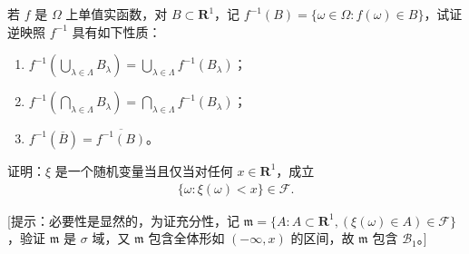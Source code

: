 \documentclass[../../main.tex]{subfiles}
\begin{document}
\begin{exercise}\label{exercise:ch03-49}
若 $f$ 是 $\varOmega$ 上单值实函数，对 $B\subset\mathbf{R}^{1}$，记 $f^{-1}(B)=\{\omega\in\varOmega:f(\omega)\in B\}$，试证逆映照 $f^{-1}$ 具有如下性质：
\begin{enumerate}
\item $f^{-1}\!\left(\bigcup_{\lambda\in\varLambda}B_\lambda\right)=\bigcup_{\lambda\in\varLambda}f^{-1}(B_\lambda)$；
\item $f^{-1}\!\left(\bigcap_{\lambda\in\varLambda}B_\lambda\right)=\bigcap_{\lambda\in\varLambda}f^{-1}(B_\lambda)$；
\item $f^{-1}(\overline{B})=\overline{f^{-1}(B)}$。
\end{enumerate}
\end{exercise}

\begin{exercise}\label{exercise:ch03-50}
证明：$\xi$ 是一个随机变量当且仅当对任何 $x\in\mathbf{R}^{1}$，成立
\begin{align*}\{\omega:\xi(\omega)<x\}\in\mathscr{F}.\end{align*}

[提示：必要性是显然的，为证充分性，记 $\mathfrak{m}=\{A:A\subset\mathbf{R}^{1},(\xi(\omega)\in A)\in\mathscr{F}\}$，验证 $\mathfrak{m}$ 是 $\sigma$ 域，又 $\mathfrak{m}$ 包含全体形如 $(-\infty,x)$ 的区间，故 $\mathfrak{m}$ 包含 $\mathscr{B}_1$。]
\end{exercise}
\end{document}
